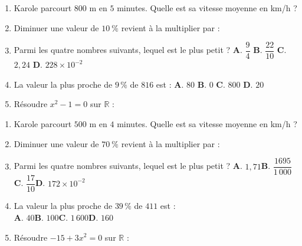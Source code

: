 \documentclass[a4paper,11pt]{article}
\begin{document}
\newpage


\begin{seance}{} %

\begin{enumerate}
\item Karole parcourt $800\text{ m}$ en $5$ minutes. Quelle est sa vitesse moyenne en km/h ? \dotfill

\dotfill

\item Diminuer une valeur de $10~\%$ revient à la multiplier par : \dotfill

\item Parmi les quatre nombres suivants, lequel est le plus petit ?
\textbf{A}. $\dfrac{9}{4}$ \quad \textbf{B}. $\dfrac{22}{10}$ \quad \textbf{C}. $2{,}24$ \quad \textbf{D}. $228 \times 10^{-2}$


\item La valeur la plus proche de $9\,\%$ de $816$ est :
\textbf{A}. $80$ \quad \textbf{B}. $0$ \quad \textbf{C}. $800$ \quad \textbf{D}. $20$


\item Résoudre $x^{2}-1=0$ sur $\mathbb{R}$ : \dotfill

\dotfill

\end{enumerate}

\end{seance}

\begin{seanceD}{} %

\begin{enumerate}
\item Karole parcourt $500\text{ m}$ en $4$ minutes. Quelle est sa vitesse moyenne en km/h ? \dotfill

\dotfill

\item Diminuer une valeur de $70~\%$ revient à la multiplier par :  \dotfill

\item Parmi les quatre nombres suivants, lequel est le plus petit ?
\textbf{A}. $1{,}71$\qquad \textbf{B}. $\dfrac{1695}{1\,000}$\qquad \textbf{C}. $\dfrac{17}{10}$\qquad \textbf{D}. $172 \times 10^{-2}$\qquad 

\item La valeur la plus proche de $39\,\%$ de $411$ est :\\ 
    	\textbf{A}. $40$\qquad \textbf{B}. $100$\qquad \textbf{C}. $1\,600$\qquad \textbf{D}. $160$\qquad 



\item Résoudre $-15+3x^{2}=0$ sur $\mathbb{R}$ : \dotfill

\dotfill

\end{enumerate}

\end{seanceD}
\end{document}
